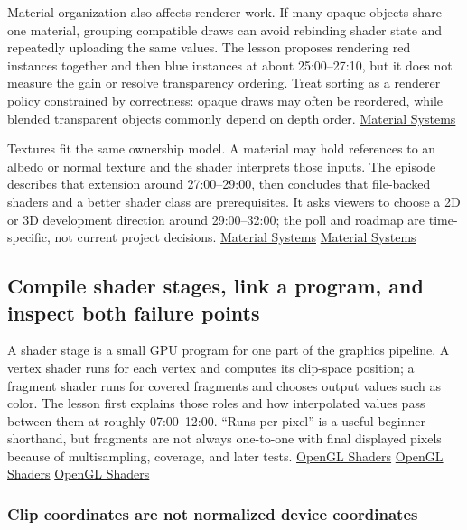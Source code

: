 Material organization also affects renderer work. If many opaque objects share one material, grouping compatible draws can avoid rebinding shader state and repeatedly uploading the same values. The lesson proposes rendering red instances together and then blue instances at about 25:00--27:10, but it does not measure the gain or resolve transparency ordering. Treat sorting as a renderer policy constrained by correctness: opaque draws may often be reordered, while blended transparent objects commonly depend on depth order. \href{https://www.youtube.com/watch?v=2k5FjtMNQsM&t=1500s}{Material Systems}

Textures fit the same ownership model. A material may hold references to an albedo or normal texture and the shader interprets those inputs. The episode describes that extension around 27:00--29:00, then concludes that file-backed shaders and a better shader class are prerequisites. It asks viewers to choose a 2D or 3D development direction around 29:00--32:00; the poll and roadmap are time-specific, not current project decisions. \href{https://www.youtube.com/watch?v=2k5FjtMNQsM&t=1620s}{Material Systems} \href{https://www.youtube.com/watch?v=2k5FjtMNQsM&t=1740s}{Material Systems}

\subsection{Compile shader stages, link a program, and inspect both failure points}\label{06-engine-ii-ch025-compile-shader-stages-link-a-program-and-inspect-both-failure-points}

\hypertarget{06-engine-ii-ch025-compile-shader-stages-link-a-program-and-inspect-both-failure-points}{}

A shader stage is a small GPU program for one part of the graphics pipeline. A vertex shader runs for each vertex and computes its clip-space position; a fragment shader runs for covered fragments and chooses output values such as color. The lesson first explains those roles and how interpolated values pass between them at roughly 07:00--12:00. ``Runs per pixel'' is a useful beginner shorthand, but fragments are not always one-to-one with final displayed pixels because of multisampling, coverage, and later tests. \href{https://www.youtube.com/watch?v=QBCCHm_9HV8&t=420s}{OpenGL Shaders} \href{https://www.youtube.com/watch?v=QBCCHm_9HV8&t=540s}{OpenGL Shaders} \href{https://www.youtube.com/watch?v=QBCCHm_9HV8&t=660s}{OpenGL Shaders}

\subsubsection{Clip coordinates are not normalized device coordinates}\label{06-engine-ii-ch025-clip-coordinates-are-not-normalized-device-coordinates}

